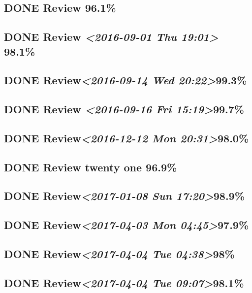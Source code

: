 \documentclass[11pt]{ctexart}
\begin{document}
\subsection{{\bfseries\sffamily DONE} Review 96.1\%}
\label{sec:org0b6d9db}
\subsection{{\bfseries\sffamily DONE} Review \textit{<2016-09-01 Thu 19:01> } 98.1\%}
\label{sec:org2e0dd76}

\subsection{{\bfseries\sffamily DONE} Review\textit{<2016-09-14 Wed 20:22>}99.3\%}
\label{sec:org4b5b0ad}
\subsection{{\bfseries\sffamily DONE} Review \textit{<2016-09-16 Fri 15:19>}99.7\%}
\label{sec:orgffc5db3}
\subsection{{\bfseries\sffamily DONE} Review\textit{<2016-12-12 Mon 20:31>}98.0\%}
\label{sec:orgf98ef62}
\subsection{{\bfseries\sffamily DONE} Review twenty one 96.9\%}
\label{sec:org852bc0e}

\subsection{{\bfseries\sffamily DONE} Review\textit{<2017-01-08 Sun 17:20>}98.9\%}
\label{sec:org3ecd297}
\subsection{{\bfseries\sffamily DONE} Review\textit{<2017-04-03 Mon 04:45>}97.9\%}
\label{sec:orgb9f5255}
\subsection{{\bfseries\sffamily DONE} Review\textit{<2017-04-04 Tue 04:38>}98\%}
\label{sec:org3a69584}
\subsection{{\bfseries\sffamily DONE} Review\textit{<2017-04-04 Tue 09:07>}98.1\%}
\label{sec:orgfcbff35}
\end{document}
